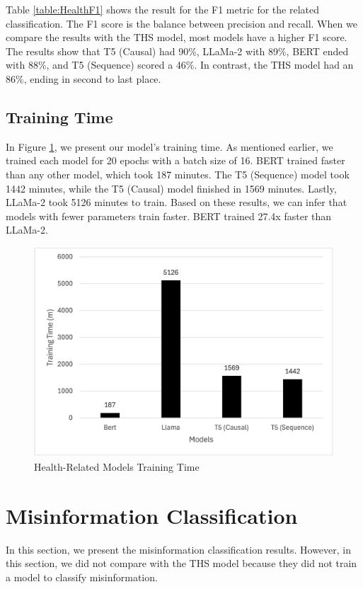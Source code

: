 Table \ref{table:HealthF1} shows the result for the F1 metric for the related classification. The F1 score is the balance between precision and recall. When we compare the results with the
THS model, most models have a higher F1 score. The results show that T5 (Causal) had 90\%, LLaMa-2 with 89\%, BERT ended with 88\%, and T5 (Sequence) scored a 46\%. In contrast,
the THS model had an 86\%, ending in second to last place.

\subsection{Training Time}

In Figure \ref{fig:HealthTime}, we present our model's training time. As mentioned earlier, we trained each model for 20 epochs with a batch size of 16. BERT trained faster than
any other model, which took 187 minutes. The T5 (Sequence) model took 1442 minutes, while the T5 (Causal) model finished in 1569 minutes. Lastly, LLaMa-2 took 5126 minutes to
train. Based on these results, we can infer that models with fewer parameters train faster. BERT trained 27.4x faster than LLaMa-2.

\begin{figure}[H]
	\begin{center}
		\includegraphics[width=1\textwidth]{images/Health_related_training_time.png} %
	\end{center}
	\caption{Health-Related Models Training Time} %
	\label{fig:HealthTime}
\end{figure}


\section{Misinformation Classification}
In this section, we present the misinformation classification results. However, in this section, we did not compare with the THS model because they did not train a model to classify
misinformation.

